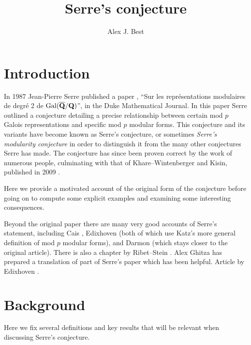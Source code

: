 \documentclass[a4paper,12pt]{article}
\title{Serre's conjecture\vspace{-14pt}} %
\author{Alex J. Best}
\date{}
\begin{document}
\maketitle
\vspace{-50pt}
\tableofcontents
\clearpage


\section{Introduction}
In 1987 Jean-Pierre Serre published a paper \cite{Serre87}, ``Sur les repr\'esentations modulaires de degr\'e 2 de $\operatorname{Gal}(\overline{\mathbf{Q}}/\mathbf{Q})$'', in the Duke Mathematical Journal.
In this paper Serre outlined a conjecture detailing a precise relationship between certain mod $p$ Galois representations and specific mod $p$ modular forms.
This conjecture and its variants have become known as Serre's conjecture, or sometimes \emph{Serre's modularity conjecture} in order to distinguish it from the many other conjectures Serre has made.
The conjecture has since been proven correct by the work of numerous people, culminating with that of Khare--Wintenberger and Kisin, published in 2009 \cite{KWI,KWII,Kisin}.

Here we provide a motivated account of the original form of the conjecture before going on to compute some explicit examples and examining some interesting consequences.

Beyond the original paper there are many very good accounts of Serre's statement, including Cais \cite{Cais}, Edixhoven \cite{Edixhoven} (both of which use Katz's more general definition of mod $p$ modular forms), and Darmon \cite{Darmon} (which stays closer to the original article).
There is also a chapter by Ribet--Stein \cite{RibetStein}. %
Alex Ghitza has prepared a translation of part of Serre's paper \cite{Ghitza} which has been helpful.
Article by Edixhoven \cite{EdixhovenWeight}.


\section{Background}
Here we fix several definitions and key results that will be relevant when discussing Serre's conjecture.
\end{document}
